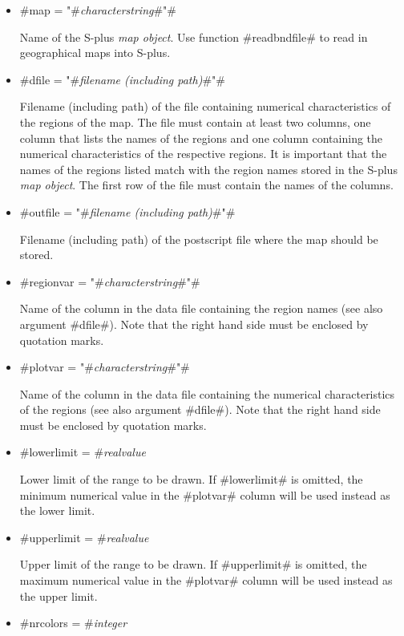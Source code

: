 \begin{itemize}
\item #map = "#{\em characterstring}#"#

Name of the S-plus {\em map object}. Use function #readbndfile# to
read in geographical maps into S-plus.

\item #dfile = "#{\em filename (including path)}#"#

Filename (including path) of the file containing numerical
characteristics of the regions of the map. The file must contain
at least two columns, one column that lists the names of the
regions and one column containing the numerical characteristics of
the respective regions. It is important that the names of the
regions listed match with the region names stored in the S-plus
{\em map object}. The first row of the file must contain the names
of the columns.

\item #outfile = "#{\em filename (including path)}#"#

Filename (including path) of the postscript file where the map
should be stored.

\item #regionvar = "#{\em characterstring}#"#

Name of the column in the data file containing the region names
(see also argument #dfile#). Note that the right hand side must be
enclosed by quotation marks.

\item #plotvar = "#{\em characterstring}#"#

Name of the column in the data file containing the numerical
characteristics of the regions (see also argument #dfile#). Note
that the right hand side must be enclosed by quotation marks.

\item #lowerlimit = #{\em realvalue}

Lower limit of the range to be drawn. If #lowerlimit# is omitted,
the minimum numerical value in the #plotvar# column will be used
instead as the lower limit.

\item #upperlimit = #{\em realvalue}

Upper limit of the range to be drawn. If #upperlimit# is omitted,
the maximum numerical value in the #plotvar# column will be used
instead as the upper limit.

\item #nrcolors = #{\em integer}


\end{itemize}
